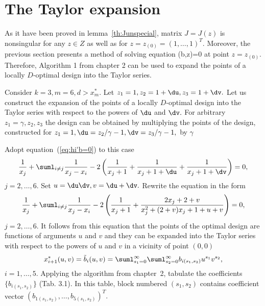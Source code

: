 \section{The Taylor expansion}

As it have been proved in lemma~\ref{th:Junspecial}, matrix
$J=J(z)$ is nonsingular for any $z\in Z$
as well as for $z=z_{(0)}=(1,\ldots,1)^T.$
Moreover, the previous section presents a method of solving equation
\beq
 \varphi(b,z)=0
 \label{eq:hi'b=0}
\eeq
at point $z=z_{(0)}.$ Therefore, Algorithm 1 from chapter 2 can be used
to expand the points of a locally $D$-optimal design into the Taylor series.

Consider $k=3,m=6,d>x^*_m.$
Let $z_1=1,z_2=1+\du,z_3=1+\dv.$
Let us construct the expansion of the points of a locally $D$-optimal
design into the Taylor series with respect to the powers of $\du$ and $\dv.$
For arbitrary $z_1=\gamma,z_2,z_3$ the design can be obtained by
multiplying the points of the design, constructed for
$z_1=1,\du=z_2/\gamma-1,\dv=z_3/\gamma-1,$ by $\gamma$

Adopt equation~(\ref{eq:hi'b=0}) to this case
$$
 \frac{1}{x_j}+\suml_{i\neq j}\frac{1}{x_j-x_i}-
 2\left( \frac{1}{x_j+1}+\frac{1}{x_j+1+\du}+\frac{1}{x_j+1+\dv} \right)=0,
$$
$j=2,\ldots,6.$ Set $u=\du\dv,v=\du+\dv.$
Rewrite the equation in the form
$$
 \frac{1}{x_j}+\suml_{i\neq j}\frac{1}{x_j-x_i}-
 2\left( \frac{1}{x_j+1}+\frac{2x_j+2+v}{x_j^2+(2+v)x_j+1+u+v} \right)=0,
$$
$j=2,\ldots,6.$ It follows from this equation that the points of the optimal
design are functions of arguments $u$ and $v$ and they can be expanded into
the Taylor series with respect to the powers of $u$ and $v$ in a vicinity
of point $(0,0)$
$$
 x^*_{i+1}(u,v)=\tilde{b}_i(u,v)=
 \suml_{s_1=0}^{\infty}\suml_{s_2=0}^{\infty}b_{i(s_1,s_2)}u^{s_1}v^{s_2},
$$
$i=1,\ldots,5.$
Applying the algorithm from chapter~2, tabulate the coefficients
$\{b_{i(s_1,s_2)}\}$ (Tab. 3.1). In this table, block numbered $(s_1,s_2)$
contains coefficient vector $(b_{1(s_1,s_2)},\ldots,b_{5(s_1,s_2)})^T.$


